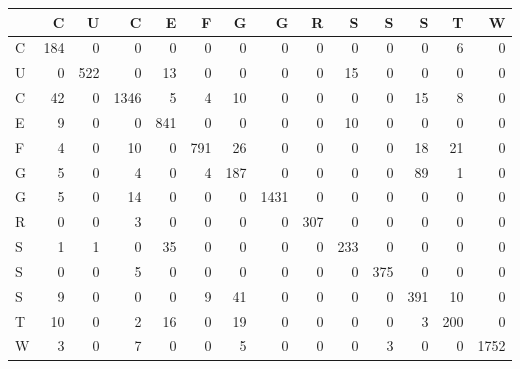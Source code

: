 \begin{tabular}{lrrrrrrrrrrrrr}
\toprule
{} &    C &    U &     C &    E &    F &    G &     G &    R &    S &    S &    S &    T &     W \\
\midrule
C &  184 &    0 &     0 &    0 &    0 &    0 &     0 &    0 &    0 &    0 &    0 &    6 &     0 \\
U &    0 &  522 &     0 &   13 &    0 &    0 &     0 &    0 &   15 &    0 &    0 &    0 &     0 \\
C &   42 &    0 &  1346 &    5 &    4 &   10 &     0 &    0 &    0 &    0 &   15 &    8 &     0 \\
E &    9 &    0 &     0 &  841 &    0 &    0 &     0 &    0 &   10 &    0 &    0 &    0 &     0 \\
F &    4 &    0 &    10 &    0 &  791 &   26 &     0 &    0 &    0 &    0 &   18 &   21 &     0 \\
G &    5 &    0 &     4 &    0 &    4 &  187 &     0 &    0 &    0 &    0 &   89 &    1 &     0 \\
G &    5 &    0 &    14 &    0 &    0 &    0 &  1431 &    0 &    0 &    0 &    0 &    0 &     0 \\
R &    0 &    0 &     3 &    0 &    0 &    0 &     0 &  307 &    0 &    0 &    0 &    0 &     0 \\
S &    1 &    1 &     0 &   35 &    0 &    0 &     0 &    0 &  233 &    0 &    0 &    0 &     0 \\
S &    0 &    0 &     5 &    0 &    0 &    0 &     0 &    0 &    0 &  375 &    0 &    0 &     0 \\
S &    9 &    0 &     0 &    0 &    9 &   41 &     0 &    0 &    0 &    0 &  391 &   10 &     0 \\
T &   10 &    0 &     2 &   16 &    0 &   19 &     0 &    0 &    0 &    0 &    3 &  200 &     0 \\
W &    3 &    0 &     7 &    0 &    0 &    5 &     0 &    0 &    0 &    3 &    0 &    0 &  1752 \\
\bottomrule
\end{tabular}
